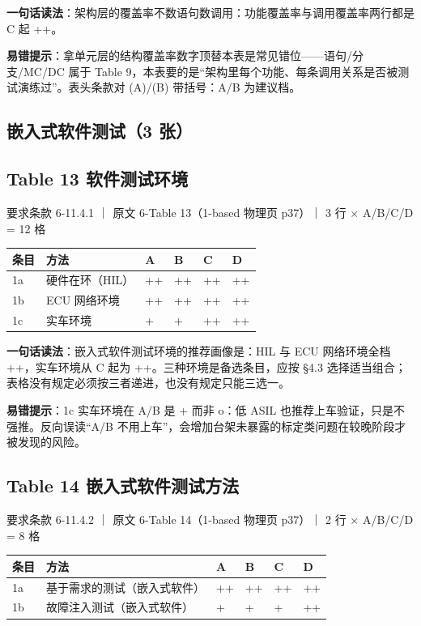 \textbf{一句话读法}：架构层的覆盖率不数语句数调用：功能覆盖率与调用覆盖率两行都是 C 起 ++。

\textbf{易错提示}：拿单元层的结构覆盖率数字顶替本表是常见错位——语句/分支/MC/DC 属于 Table 9，本表要的是“架构里每个功能、每条调用关系是否被测试演练过”。表头条款对 (A)/(B) 带括号：A/B 为建议档。

\subsection{嵌入式软件测试（3 张）}

\subsection{Table 13 软件测试环境}

要求条款 6-11.4.1 ｜ 原文 6-Table 13（1-based 物理页 p37）｜ 3 行 \(\times\) A/B/C/D = 12 格

\begin{center}
\begingroup\small
\setlength{\tabcolsep}{4pt}
\begin{tabularx}{\linewidth}{@{}XXXXXX@{}}
\toprule
条目 & 方法 & A & B & C & D \\
\midrule
1a & 硬件在环（HIL） & ++ & ++ & ++ & ++ \\
1b & ECU 网络环境 & ++ & ++ & ++ & ++ \\
1c & 实车环境 & + & + & ++ & ++ \\
\bottomrule
\end{tabularx}
\endgroup
\end{center}

\textbf{一句话读法}：嵌入式软件测试环境的推荐画像是：HIL 与 ECU 网络环境全档 ++，实车环境从 C 起为 ++。三种环境是备选条目，应按 §4.3 选择适当组合；表格没有规定必须按三者递进，也没有规定只能三选一。

\textbf{易错提示}：1c 实车环境在 A/B 是 + 而非 o：低 ASIL 也推荐上车验证，只是不强推。反向误读“A/B 不用上车”，会增加台架未暴露的标定类问题在较晚阶段才被发现的风险。

\subsection{Table 14 嵌入式软件测试方法}

要求条款 6-11.4.2 ｜ 原文 6-Table 14（1-based 物理页 p37）｜ 2 行 \(\times\) A/B/C/D = 8 格

\begin{center}
\begingroup\small
\setlength{\tabcolsep}{4pt}
\begin{tabularx}{\linewidth}{@{}XXXXXX@{}}
\toprule
条目 & 方法 & A & B & C & D \\
\midrule
1a & 基于需求的测试（嵌入式软件） & ++ & ++ & ++ & ++ \\
1b & 故障注入测试（嵌入式软件） & + & + & + & ++ \\
\bottomrule
\end{tabularx}
\endgroup
\end{center}


